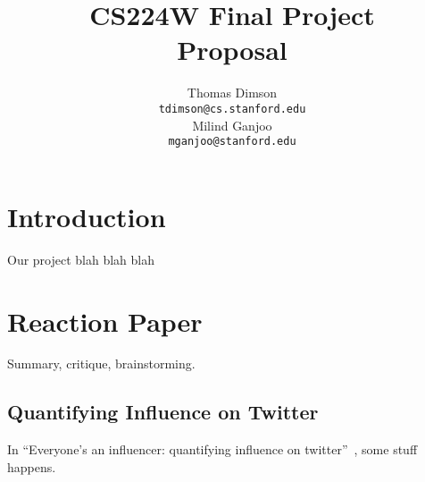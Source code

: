 \documentclass[11pt]{article}
\title{{\small CS224W Final Project} \\ Proposal}
\author{Thomas Dimson \\
  {\tt tdimson@cs.stanford.edu}
  \\\And
  Milind Ganjoo \\
  {\tt mganjoo@stanford.edu}
}
\date{}
\newcommand{\titlecite}[2]{``#1''~\cite{#2}}
\begin{document}
\maketitle

\section{Introduction}
Our project blah blah blah

\section{Reaction Paper}
Summary, critique, brainstorming.


\subsection{Quantifying Influence on Twitter}
In \titlecite{Everyone's an influencer: quantifying influence on twitter}{bakshy2011everyone}, 
some stuff happens.

\end{document}

